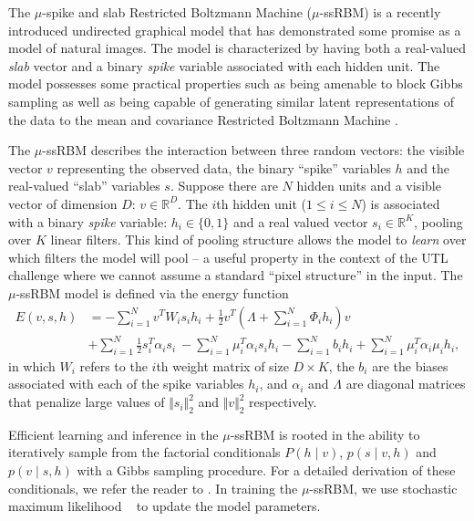 The $\mu$-spike and slab Restricted Boltzmann Machine ($\mu$-ssRBM)
\citep{Courville+al-2011} is a recently introduced undirected graphical model
that has demonstrated some promise as a model of natural images. The model
is characterized by having both a real-valued \emph{slab} vector and a
binary \emph{spike} variable associated with each hidden unit. The model
possesses some practical properties such as being amenable to block Gibbs
sampling as well as being capable of generating similar latent
representations of the data to the mean and covariance
Restricted Boltzmann Machine \citep{Ranzato2010b}.

The $\mu$-ssRBM describes the interaction between three random vectors: the
visible vector $v$ representing the observed data, the binary ``spike''
variables $h$ and the real-valued ``slab'' variables $s$.
%
Suppose there are $N$ hidden units and a
visible vector of dimension $D$: $v\in\mathbb{R}^{D}$.
%
The $i$th hidden unit ($1
\leq i \leq N$) is
associated with a binary \emph{spike} variable: $h_i \in \{0,1\}$ and a real
valued vector $s_i \in \mathbb{R}^{K}$, pooling over $K$ linear
filters. This kind of pooling structure allows the model to \emph{learn}
over which filters the model will pool -- a useful property in the context
of the UTL challenge where we cannot assume a standard ``pixel structure'' in the input.
%
The $\mu$-ssRBM
model is defined via the energy function
{\small
\begin{align}
E(v,s,h) &= -\sum_{i=1}^{N}v^{T}W_{i}s_{i}h_{i} +\frac{1}{2}v^{T}\left(\Lambda+\sum_{i=1}^{N}\Phi_{i}h_{i}\right)v \nonumber \\
         &  +\sum_{i=1}^{N} \frac{1}{2}s_{i}^{T}\alpha_{i}s_{i}\ -\sum_{i=1}^{N} \mu_{i}^{T}\alpha_{i}s_{i}h_{i}
            -\sum_{i=1}^{N}b_{i}h_{i} +\sum_{i=1}^{N}\mu_{i}^{T}\alpha_{i}\mu_{i}h_{i}, \nonumber
\label{eq:mu_energy}
\end{align}
}
in which $W_{i}$ refers to the $i$th weight matrix of size $D\times K$, the
$b_i$ are the biases associated with each of the spike variables $h_i$, and
$\alpha_i$ and $\Lambda$ are diagonal matrices that penalize large values
of $\Vert s_i \Vert_2^2$ and $\Vert v \Vert_2^2$ respectively. 

\bigskip

Efficient learning and inference in the $\mu$-ssRBM is rooted in the ability to
iteratively sample from the factorial conditionals $P(h \mid v)$, $p(s \mid
v,h)$ and $p(v \mid s, h)$ with a Gibbs sampling procedure. For a detailed
derivation of these conditionals, we refer the reader to \citep{Courville+al-2011}.
In training the $\mu$-ssRBM, we use stochastic maximum likelihood
~\citep{Tieleman08} to update the model parameters.


